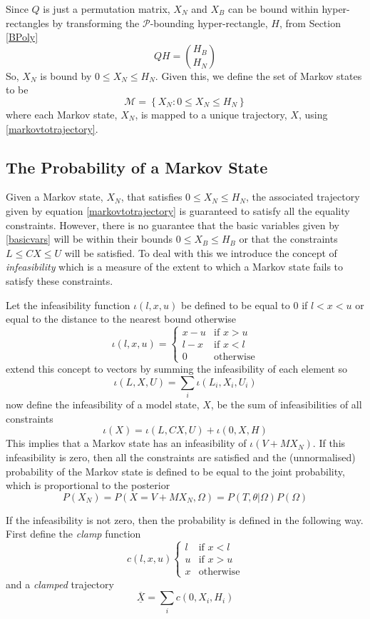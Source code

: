 \documentclass{article}
\begin{document}
Since $Q$ is just a permutation matrix, $X_N$ and $X_B$ can be bound within hyper-rectangles by transforming the $\mathcal{P}$-bounding hyper-rectangle, $H$, from Section \ref{BPoly}
\[
QH = {H_B \choose H_N}
\]
So, $X_N$ is bound by $0 \le X_N \le H_N$. Given this, we define the set of Markov states to be
\[
\mathcal{M} = \left\{ X_N: 0 \le X_N \le H_N \right\}
\]
where each Markov state, $X_N$, is mapped to a unique trajectory, $X$, using \eqref{markovtotrajectory}.

\subsection{The Probability of a Markov State}

Given a Markov state, $X_N$, that satisfies $0 \le X_N \le H_N$, the associated trajectory given by equation \eqref{markovtotrajectory} is guaranteed to satisfy all the equality constraints. However, there is no guarantee that the basic variables given by \eqref{basicvars} will be within their bounds $0 \le X_B \le H_B$ or that the constraints $L \le CX \le U$ will be satisfied. To deal with this we introduce the concept of \textit{infeasibility} which is a measure of the extent to which a Markov state fails to satisfy these constraints.

Let the infeasibility function $\iota(l,x,u)$ be defined to be equal to 0 if $l < x < u$ or equal to the distance to the nearest bound otherwise
\[
\iota(l,x,u) =
\begin{cases}
x-u & \text{if }x>u\\
l-x & \text{if }x<l\\
0 & \text{otherwise}
\end{cases}
\]
extend this concept to vectors by summing the infeasibility of each element so
\[
\iota(L,X,U) = \sum_i \iota(L_i,X_i,U_i)
\]
now define the infeasibility of a model state, $X$, be the sum of infeasibilities of all constraints
\[
\iota(X) = \iota(L, CX, U) + \iota(0, X, H)
\]
This implies that a Markov state has an infeasibility of $\iota(V + MX_N)$. If this infeasibility is zero, then all the constraints are satisfied and the (unnormalised) probability of the Markov state is defined to be equal to the joint probability, which is proportional to the posterior
\[
P(X_N) = P(X=V + MX_N,\Omega) = P(T,\theta|\Omega)P(\Omega)
\]

If the infeasibility is not zero, then the probability is defined in the following way. First define the \textit{clamp} function
\[
c(l,x,u) \begin{cases}
l & \text{if }x<l\\
u & \text{if }x>u\\
x & \text{otherwise}
\end{cases}
\]
and a \textit{clamped} trajectory
\[
\overline{\underline{X}} = \sum_i c(0,X_i,H_i)
\]
\end{document}
